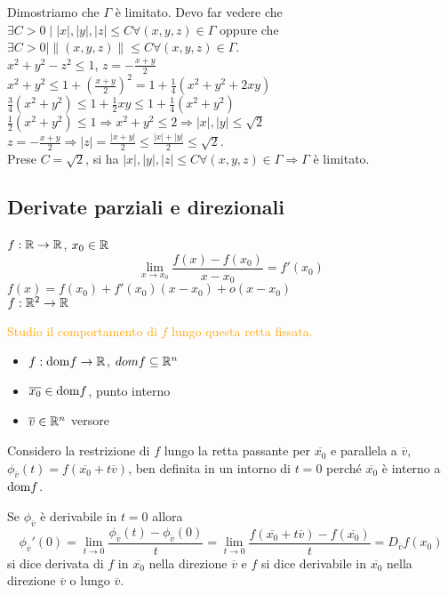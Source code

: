 \begin{exbar}
\begin{example}
	Dimostriamo che $\Gamma $ è limitato. Devo far vedere che $\exists C>0\mid |x|,|y|,|z|\leq C \forall (x,y,z)\in \Gamma$ oppure che $\exists C>0\mid \|(x,y,z)\|\leq C\forall(x,y,z)\in\Gamma$.\\
	$x^2+y^2-z^2\leq 1$, $z=-\frac{x+y}{2}$\\
	$x^2+y^2\leq 1+\left(\frac{x+y}{2}\right)^2=1+\frac{1}{4}(x^2+y^2+2xy)$\\
	$\frac{3}{4}(x^2+y^2)\leq 1+\frac{1}{2}xy\leq 1+\frac{1}{4}(x^2+y^2)$\\
	$\frac{1}{2}(x^2+y^2)\leq 1\Rightarrow x^2+y^2\leq 2\Rightarrow |x|,|y|\leq \sqrt{2}$\\
	$z=-\frac{x+y}{2}\Rightarrow |z|=\frac{|x+y|}{2}\leq \frac{|x|+|y|}{2}\leq \sqrt{2}$.\\
	Prese $C=\sqrt{2}$, si ha $|x|,|y|,|z|\leq C\forall(x,y,z)\in \Gamma\Rightarrow\Gamma$ è limitato.
\end{example}
\end{exbar}


\subsection{Derivate parziali e direzionali}
$f:\mathbb{R}\rightarrow\mathbb{R}$, $x_0\in\mathbb{R}$
\begin{equation*}
	\lim_{x \rightarrow x_0}\frac{f(x)-f(x_0)}{x-x_0}=f'(x_0)
\end{equation*}
$f(x)=f(x_0)+f'(x_0)(x-x_0)+o(x-x_0)$\\
$f:\mathbb{R}^2\rightarrow\mathbb{R}$\\

\segnaposto %

\textcolor{orange}{Studio il comportamento di $f$ lungo questa retta fissata.}
\begin{itemize}
	\item $f:\mathrm{dom} f\rightarrow\mathbb{R}$, $domf \subseteq \mathbb{R}^n$
	\item $\overline{x_0}\in \mathrm{dom} f$, punto interno
	\item $\overline{v}\in \mathbb{R}^n$ versore
\end{itemize}
Considero la restrizione di $f$ lungo la retta passante per $\overline{x_0}$ e parallela a $\overline{v}$, $\phi_{\overline{v}}(t)=f(\overline{x_0}+t\overline{v})$, ben definita in un intorno di $t=0$ perché $\overline{x_0}$ è interno a $\mathrm{dom} f$.


\begin{definition}
	Se $\phi_{\overline{v}}$ è derivabile in $t=0$ allora 
	\begin{equation*}
		\phi_{\overline{v}}'(0)=\lim_{t\rightarrow0}\frac{\phi_{\overline{v}}(t)-\phi_{\overline{v}}(0)}{t}=\lim_{t\rightarrow 0}\frac{f(\overline{x_0}+t\overline{v})-f(\overline{x_0})}{t}=D_{\overline{v}}f(x_0)
	\end{equation*}
	si dice derivata di $f$ in $\overline{x_0}$ nella direzione $\overline{v}$ e $f$ si dice derivabile in $\overline{x_0}$ nella direzione $\overline{v}$ o lungo $\overline{v}$.
\end{definition}


